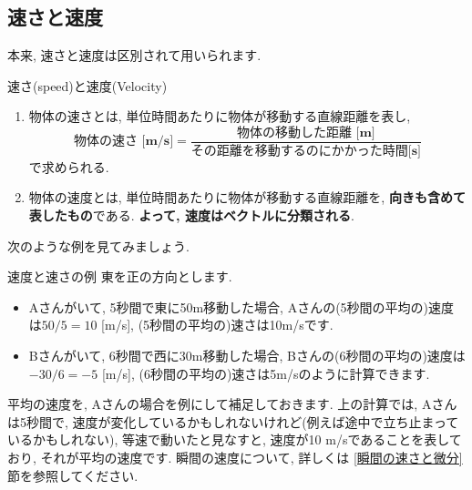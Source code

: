 \documentclass[11pt,dvipdfmx]{jsarticle}
\numberwithin{equation}{section} %
\begin{document}
\subsection{速さと速度}
本来, 速さと速度は区別されて用いられます. 
\begin{freebox}{速さ(speed)と速度(Velocity)}
\begin{enumerate}
    \item 物体の速さとは, 単位時間あたりに物体が移動する直線距離を表し, 
    \begin{equation}
    \textbf{物体の速さ [m/s]} = \frac{\textbf{物体の移動した距離 [m]}}{\textbf{その距離を移動するのにかかった時間[s]}}
    \end{equation}
    で求められる.
    \item 物体の速度とは, 単位時間あたりに物体が移動する直線距離を, \textbf{向きも含めて表したもの}である. \textbf{よって, 速度はベクトルに分類される}.
\end{enumerate}
\end{freebox}
次のような例を見てみましょう. 
\begin{exbox}{速度と速さの例}
    東を正の方向とします. 
\begin{center}
\end{center}
\begin{itemize}
    \item Aさんがいて, 5秒間で東に50m移動した場合, Aさんの(5秒間の平均の)速度は$50/5 = 10$ [m/s], (5秒間の平均の)速さは10m/sです.
    \item Bさんがいて, 6秒間で西に30m移動した場合, Bさんの(6秒間の平均の)速度は$-30/6 = -5$ [m/s], (6秒間の平均の)速さは5m/sのように計算できます.
\end{itemize}
\end{exbox}
平均の速度を, Aさんの場合を例にして補足しておきます. 上の計算では, Aさんは5秒間で, 速度が変化しているかもしれないけれど(例えば途中で立ち止まっているかもしれない), 等速で動いたと見なすと, 速度が10 m/sであることを表しており, それが平均の速度です. 瞬間の速度について, 詳しくは \ref{瞬間の速さと微分}節を参照してください.
\end{document}
